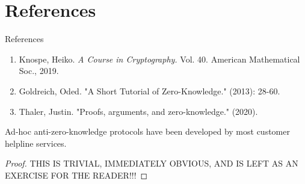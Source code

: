 \section{References}
\begin{frame}{References}
    \begin{enumerate}
        \item Knospe, Heiko. \textit{A Course in Cryptography.} Vol. 40. American Mathematical Soc., 2019.
        \item Goldreich, Oded. "A Short Tutorial of Zero-Knowledge." (2013): 28-60.
        \item Thaler, Justin. "Proofs, arguments, and zero-knowledge." (2020).
    \end{enumerate}
\end{frame}
\begin{frame}{}
     \begin{theorem}
     Ad-hoc anti-zero-knowledge protocols have been developed by most customer helpline services.
     \end{theorem}
     \begin{proof}
     THIS IS TRIVIAL, IMMEDIATELY OBVIOUS, AND IS LEFT AS AN EXERCISE FOR THE READER!!!
     \end{proof}
\end{frame}

